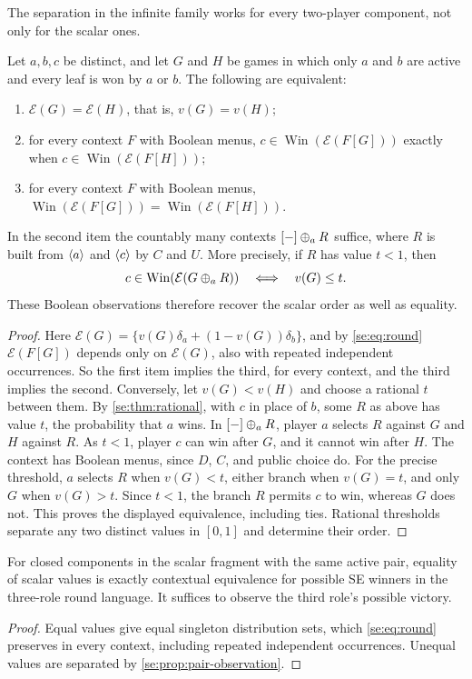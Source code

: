 The separation in the infinite family works for every two-player
component, not only for the scalar ones.

\begin{proposition}\label{se:prop:pair-observation}
Let $a,b,c$ be distinct, and let $G$ and $H$ be games in which only $a$
and $b$ are active and every leaf is won by $a$ or $b$. The following are
equivalent:
\begin{enumerate}
\item $\mathcal E(G)=\mathcal E(H)$, that is, $v(G)=v(H)$;
\item for every context $F$ with Boolean menus,
  $c\in\operatorname{Win}(\mathcal E(F[G]))$ exactly when
  $c\in\operatorname{Win}(\mathcal E(F[H]))$;
\item for every context $F$ with Boolean menus,
  $\operatorname{Win}(\mathcal E(F[G]))=\operatorname{Win}(\mathcal E(F[H]))$.
\end{enumerate}
In the second item the countably many contexts $[-]\mathbin{\oplus_{a}} R$ suffice,
where $R$ is built from $\langle a\rangle$ and $\langle c\rangle$ by $C$ and $U$.
More precisely, if $R$ has value $t<1$, then
\[
 c\in\operatorname{Win}(\mathcal E(G\mathbin{\oplus_{a}} R))
 \quad\Longleftrightarrow\quad v(G)\leq t.
\]
These Boolean observations therefore recover the scalar order as well as
equality.
\end{proposition}
\begin{proof}
Here $\mathcal E(G)=\{v(G)\delta_a+(1-v(G))\delta_b\}$, and
by \eqref{se:eq:round} $\mathcal E(F[G])$ depends only on
$\mathcal E(G)$, also with repeated independent occurrences. So the first
item implies the third, for every context, and the third implies the
second. Conversely, let $v(G)<v(H)$ and choose a rational $t$ between
them. By \cref{se:thm:rational}, with $c$ in place of $b$, some $R$ as
above has value $t$, the probability that $a$ wins. In $[-]\mathbin{\oplus_{a}} R$,
player $a$ selects $R$ against $G$ and $H$ against $R$. As $t<1$, player
$c$ can win after $G$, and it cannot win after $H$. The context has
Boolean menus, since $D$, $C$, and public choice do.
For the precise threshold, $a$ selects $R$ when $v(G)<t$, either branch
when $v(G)=t$, and only $G$ when $v(G)>t$. Since $t<1$, the branch $R$
permits $c$ to win, whereas $G$ does not. This proves the displayed
equivalence, including ties. Rational thresholds separate any two distinct
values in $[0,1]$ and determine their order.
\end{proof}

\begin{corollary}\label{se:cor:scalar}
For closed components in the scalar fragment with the same
active pair, equality of scalar values is exactly contextual
equivalence for possible SE winners in the three-role round language.
It suffices to observe the third role's possible victory.
\end{corollary}
\begin{proof}
Equal values give equal singleton distribution sets, which
\eqref{se:eq:round} preserves in every context, including repeated
independent occurrences. Unequal values are separated by
\cref{se:prop:pair-observation}.
\end{proof}

